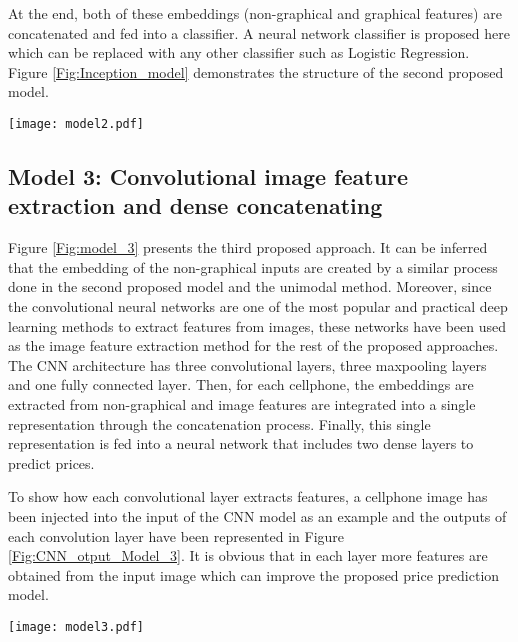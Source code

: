 \documentclass{svjour3}                     \smartqed  \usepackage{graphicx}
\begin{document}
At the end, both of these embeddings (non-graphical and graphical features) are concatenated and fed into a classifier. A neural network classifier is proposed here which can be replaced with any other classifier such as Logistic Regression. Figure \ref{Fig:Inception_model} demonstrates the structure of the second proposed model.

\begin{figure*}
    \centering
    \texttt{[image: model2.pdf]}
    \caption{Architecture of the proposed Inception-based method (Model 2).}
    \label{Fig:Inception_model}
\end{figure*}
\subsection{Model 3: Convolutional image feature extraction and dense concatenating}\label{Subsec:model_3}
Figure \ref{Fig:model_3} presents the third proposed approach. It can be inferred that the embedding of the non-graphical inputs are created by a similar process done in the second proposed model and the unimodal method. Moreover, since the convolutional neural networks are one of the most popular and practical deep learning methods to extract features from images, these networks have been used as the image feature extraction method for the rest of the proposed approaches.  The CNN architecture has three convolutional layers, three maxpooling layers and one fully connected layer. Then, for each cellphone, the embeddings are extracted from non-graphical and image features are integrated into a single representation through the concatenation process. Finally, this single representation is fed into a neural network that includes two dense layers to predict prices.

To show how each convolutional layer extracts features, a cellphone image has been injected into the input of the CNN model as an example and the outputs of each convolution layer have been represented in Figure \ref{Fig:CNN_otput_Model_3}. It is obvious that in each layer more features are obtained from the input image which can improve the proposed price prediction model.

\begin{figure*}
    \centering
    \texttt{[image: model3.pdf]}
    \caption{The neural network architecture of the third model.}
    \label{Fig:model_3}
\end{figure*}
\end{document}

